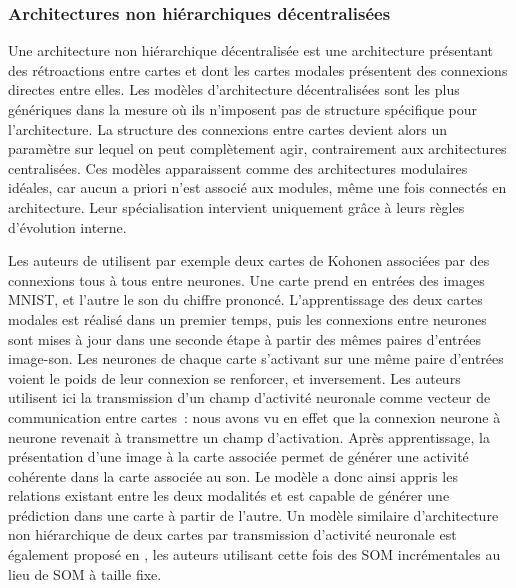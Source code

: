 \documentclass[../main]{subfiles}
\begin{document}
\subsubsection{Architectures non hiérarchiques décentralisées}

Une architecture non hiérarchique décentralisée est une architecture présentant des rétroactions entre cartes et dont les cartes modales présentent des connexions directes entre elles.
Les modèles d'architecture décentralisées sont les plus génériques dans la mesure où ils n'imposent pas de structure spécifique pour l'architecture.
La structure des connexions entre cartes devient alors un paramètre sur lequel on peut complètement agir, contrairement aux architectures centralisées. 
Ces modèles apparaissent comme des architectures modulaires idéales, car aucun a priori n'est associé aux modules, même une fois connectés en architecture. Leur spécialisation intervient uniquement grâce à leurs règles d'évolution interne.

Les auteurs de \cite{khacef_brain-inspired_2020} utilisent par exemple deux cartes de Kohonen associées par des connexions tous à tous entre neurones. Une carte prend en entrées des images MNIST, et l'autre le son du chiffre prononcé. L'apprentissage des deux cartes modales est réalisé dans un premier temps, puis les connexions entre neurones sont mises à jour dans une seconde étape à partir des mêmes paires d'entrées image-son. Les neurones de chaque carte s'activant sur une même paire d'entrées voient le poids de leur connexion se renforcer, et inversement. Les auteurs utilisent ici la transmission d'un champ d'activité neuronale comme vecteur de communication entre cartes~: nous avons vu en effet que la connexion neurone à neurone revenait à transmettre un champ d'activation.
Après apprentissage, la présentation d'une image à la carte associée permet de générer une activité cohérente dans la carte associée au son. Le modèle a donc ainsi appris les relations existant entre les deux modalités et est capable de générer une prédiction dans une carte à partir de l'autre.
Un modèle similaire d'architecture non hiérarchique de deux cartes par transmission d'activité neuronale est également proposé en \cite{jayaratne_bio-inspired_2018}, les auteurs utilisant cette fois des SOM incrémentales au lieu de SOM à taille fixe.
\end{document}
